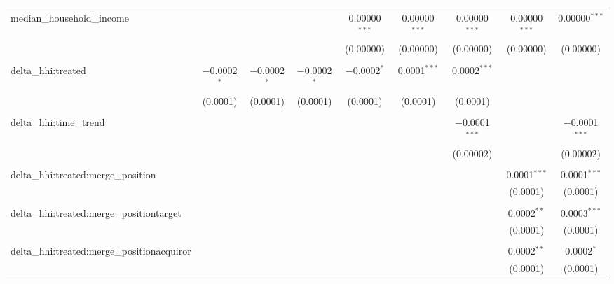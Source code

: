 \begin{table}[H]
{\begin{tabular}{@{\extracolsep{5pt}}lcccccccc}
   & & & & & & & & \\  

  median\_household\_income &  &  &  & 0.00000$^{***}$ & 0.00000$^{***}$ & 0.00000$^{***}$ & 0.00000$^{***}$ & 0.00000$^{***}$ \\  

   &  &  &  & (0.00000) & (0.00000) & (0.00000) & (0.00000) & (0.00000) \\  

   & & & & & & & & \\  

  delta\_hhi:treated & $-$0.0002$^{*}$ & $-$0.0002$^{*}$ & $-$0.0002$^{*}$ & $-$0.0002$^{*}$ & 0.0001$^{***}$ & 0.0002$^{***}$ &  &  \\  

   & (0.0001) & (0.0001) & (0.0001) & (0.0001) & (0.0001) & (0.0001) &  &  \\  

   & & & & & & & & \\  

  delta\_hhi:time\_trend &  &  &  &  &  & $-$0.0001$^{***}$ &  & $-$0.0001$^{***}$ \\  

   &  &  &  &  &  & (0.00002) &  & (0.00002) \\  

   & & & & & & & & \\  

  delta\_hhi:treated:merge\_position &  &  &  &  &  &  & 0.0001$^{***}$ & 0.0001$^{***}$ \\  

   &  &  &  &  &  &  & (0.0001) & (0.0001) \\  

   & & & & & & & & \\  

  delta\_hhi:treated:merge\_positiontarget &  &  &  &  &  &  & 0.0002$^{**}$ & 0.0003$^{***}$ \\  

   &  &  &  &  &  &  & (0.0001) & (0.0001) \\  

   & & & & & & & & \\  

  delta\_hhi:treated:merge\_positionacquiror &  &  &  &  &  &  & 0.0002$^{**}$ & 0.0002$^{*}$ \\  

   &  &  &  &  &  &  & (0.0001) & (0.0001) \\  


\end{tabular}}
\end{table}
